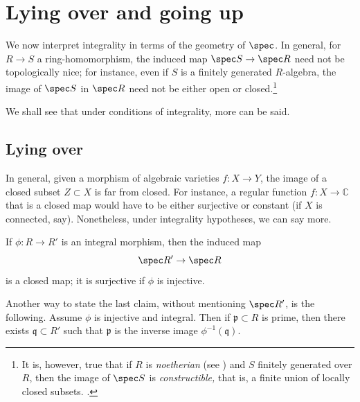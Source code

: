 \section{Lying over and going up}
We now interpret integrality in terms of the geometry of $\spec$.
In general, for $R \to S$ a ring-homomorphism, the induced map $\spec S \to
\spec R$ need not be topologically nice; for instance, even if $S$ is a
finitely generated $R$-algebra, the image of $\spec S$ in $\spec R$ need not
be either open or closed.\footnote{It is, however, true that if $R$ is
\emph{noetherian} (see ) and $S$ finitely generated over
$R$, then the image of $\spec S$ is \emph{constructible,} that is, a finite
union of locally closed subsets. .}

We shall see that under conditions of integrality, more can be said.



\subsection{Lying over}

In general, given a morphism of algebraic varieties $f: X \to Y$, the image of
a closed subset $Z \subset X$ is far from closed.  For instance, a regular function $f: X \to \mathbb{C}$ 
that is a closed map would have to be either surjective or constant (if $X$ is
connected, say).
Nonetheless, under integrality hypotheses, we can say more.

\begin{proposition} \label{lyingover}
If $\phi: R \to R'$ is an integral morphism, then the induced map
\[  \spec R' \to \spec R  \]
is a closed map; it is surjective if $\phi$ is injective.
 \end{proposition}

Another way to state the last claim, without mentioning $\spec R'$, is the
following. Assume $\phi$ is injective and integral. Then if
$\mathfrak{p} \subset R$ is prime, then there exists $\mathfrak{q} \subset R'$
such that $\mathfrak{p}$ is the inverse image $\phi^{-1}(\mathfrak{q})$.

